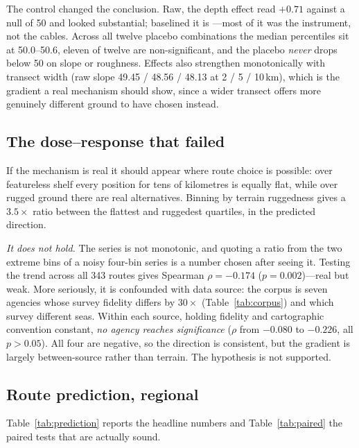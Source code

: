 \documentclass[journal]{IEEEtran}
\begin{document}


The control changed the conclusion. Raw, the depth effect read $+0.71$ against
a null of 50 and looked substantial; baselined it is \nPlaceboDepth---most of
it was the instrument, not the cables. Across all twelve placebo combinations
the median percentiles sit at 50.0--50.6, eleven of twelve are
non-significant, and the placebo \emph{never} drops below 50 on slope or
roughness. Effects also strengthen monotonically with transect width (raw slope
49.45 / 48.56 / 48.13 at 2 / 5 / 10\,km), which is the gradient a real
mechanism should show, since a wider transect offers more genuinely different
ground to have chosen instead.

\subsection{The dose--response that failed}\label{sec:dose}
If the mechanism is real it should appear where route choice is possible: over
featureless shelf every position for tens of kilometres is equally flat, while
over rugged ground there are real alternatives. Binning by terrain ruggedness
gives a $3.5\times$ ratio between the flattest and ruggedest quartiles, in the
predicted direction.

\emph{It does not hold.} The series is not monotonic, and quoting a ratio from
the two extreme bins of a noisy four-bin series is a number chosen after seeing
it. Testing the trend across all 343 routes gives Spearman $\rho=-0.174$
($p=0.002$)---real but weak. More seriously, it is confounded with data source:
the corpus is seven agencies whose survey fidelity differs by $30\times$
(Table~\ref{tab:corpus}) and which survey different seas. Within each source,
holding fidelity and cartographic convention constant, \emph{no agency reaches
significance} ($\rho$ from $-0.080$ to $-0.226$, all $p>0.05$). All four are
negative, so the direction is consistent, but the gradient is largely
between-source rather than terrain. The hypothesis is not supported.

\subsection{Route prediction, regional}\label{sec:prediction}
Table~\ref{tab:prediction} reports the headline numbers and
Table~\ref{tab:paired} the paired tests that are actually sound.



\end{document}
